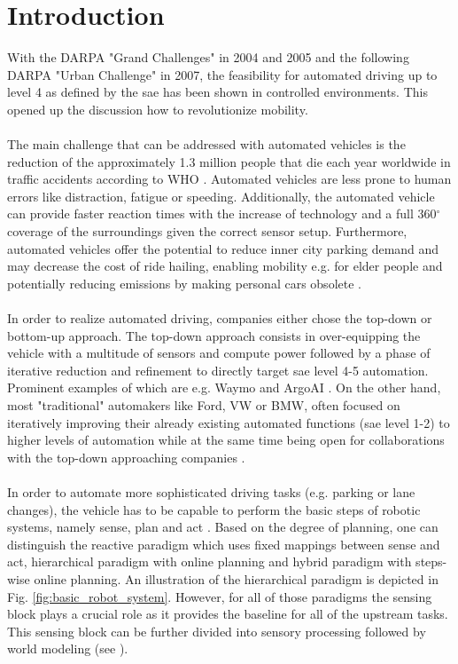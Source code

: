 \chapter{Introduction}
\label{ch:introduction}
With the DARPA "Grand Challenges" \cite{thrun2006stanley} in 2004 and 2005 and the following DARPA "Urban Challenge" \cite{Urmson-2007-9708} in 2007, the feasibility for automated driving up to level 4 as defined by the \gls{sae} \cite{SAE2017} has been shown in controlled environments. This opened up the discussion how to revolutionize mobility. 
\\\\
The main challenge that can be addressed with automated vehicles is the reduction of the approximately 1.3 million people that die each year worldwide in traffic accidents according to WHO \cite{world2018global}. Automated vehicles are less prone to human errors like distraction, fatigue or speeding. Additionally, the automated vehicle can provide faster reaction times with the increase of technology and a full 360$^{\circ}$ coverage of the surroundings given the correct sensor setup. Furthermore, automated vehicles offer the potential to reduce inner city parking demand \cite{zhang2020impacts} and may decrease the cost of ride hailing, enabling mobility e.g. for elder people and potentially reducing emissions by making personal cars obsolete \cite{severino2021autonomous}.  
\\\\
In order to realize automated driving, companies either chose the top-down or bottom-up approach. The top-down approach consists in over-equipping the vehicle with a multitude of sensors and compute power followed by a phase of iterative reduction and refinement to directly target \gls{sae} level 4-5 automation. Prominent examples of which are e.g. Waymo \cite{sun2020scalability} and ArgoAI \cite{chang2019argoverse}. On the other hand, most "traditional" automakers like Ford, VW or BMW, often focused on iteratively improving their already existing automated functions (\gls{sae} level 1-2) to higher levels of automation while at the same time being open for collaborations with the top-down approaching companies \cite{fordargovw2020}.
\\\\
In order to automate more sophisticated driving tasks (e.g. parking or lane changes), the vehicle has to be capable to perform the basic steps of robotic systems, namely sense, plan and act \cite{arkin1998behavior}. Based on the degree of planning, one can distinguish the reactive paradigm which uses fixed mappings between sense and act, hierarchical paradigm with online planning and hybrid paradigm with steps-wise online planning. An illustration of the hierarchical paradigm is depicted in Fig. \ref{fig:basic_robot_system}. However, for all of those paradigms the sensing block plays a crucial role as it provides the baseline for all of the upstream tasks. This sensing block can be further divided into sensory processing followed by world modeling (see \cite{arkin1998behavior}).
